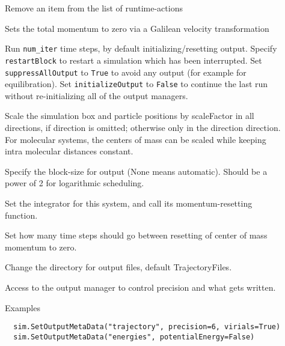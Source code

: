 \documentclass[a4paper]{article}
\begin{document}
\begin{description}
\item[]
  Remove an item from the list of runtime-actions

\item[]
  Sets the total momentum to zero via a Galilean velocity transformation

\item[]
  Run \verb|num_iter| time steps, by default initializing/resetting output.
  Specify \verb|restartBlock| to restart a simulation which has been
  interrupted. Set \verb|suppressAllOutput| to \verb|True| to avoid any output
  (for example for equilibration). Set \verb|initializeOutput| to \verb|False|
  to continue the last run without re-initializing all of the output managers.

\item[]
  Scale the simulation box and particle positions by scaleFactor
  in all directions, if direction is omitted; otherwise only
  in the direction direction. For molecular systems, the centers of 
  mass can be scaled while keeping intra molecular distances constant.


\item[]
  Specify the block-size for output (None means automatic). Should be a
  power of 2 for logarithmic scheduling.
  

\item[]
  Set the integrator for this system, and call its momentum-resetting
  function.
  
\item[]
  Set how many time steps should go between resetting of
  center of mass momentum to zero.
  
\item[]
  Change the directory for output files, default TrajectoryFiles.
  
\item[]
  Access to the output manager to control precision and what gets written.
  
  Examples
  
\begin{verbatim}
  sim.SetOutputMetaData("trajectory", precision=6, virials=True)
  sim.SetOutputMetaData("energies", potentialEnergy=False)
\end{verbatim}  


\end{description}
\end{document}
